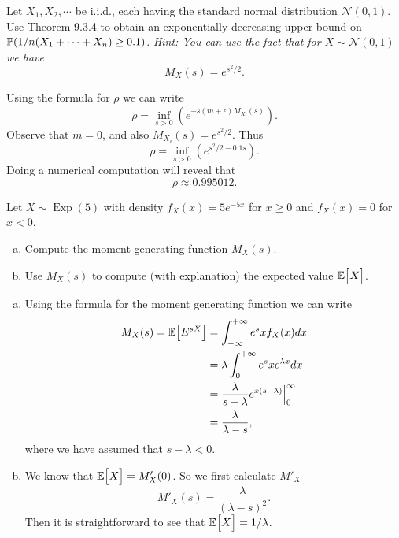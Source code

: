 \begin{problem}
	Let $ X_1,X_2,\cdots $ be i.i.d., each having the standard normal distribution $ \mathcal{N}(0,1) $. Use Theorem 9.3.4 to obtain an exponentially decreasing upper bound on $ \mathbb{P}(1/n(X_1+\cdots+X_n)\geq 0.1) $. \emph{Hint: You can use the fact that for $ X\sim\mathcal{N}(0,1) $ we have}
	\[ M_X(s) = e^{s^2/2}. \]
\end{problem}
\begin{solution}
	Using the formula for $ \rho $ we can write
	\[ \rho = \inf_{s>0}(e^{-s(m+\epsilon)M_{X_i}(s)}). \]
	Observe that $ m = 0 $, and also $ M_{X_i}(s) = e^{s^2/2} $. Thus
	\[ \rho = \inf_{s>0} (e^{s^2/2-0.1s}). \]
	Doing a numerical computation will reveal that
	\[ \rho \approx 0.995012. \]
\end{solution}


\begin{problem}
	Let $ X\sim \operatorname{Exp}(5) $ with density $ f_X(x) = 5e^{-5x} $ for $ x\geq 0 $ and $ f_X(x) = 0 $ for $ x<0 $.
	\begin{enumerate}[(a)]
		\item Compute the moment generating function $ M_X(s) $.
		\item Use $ M_X(s) $ to compute (with explanation) the expected value $ \mathbb{E}\big[X\big] $.
	\end{enumerate}
\end{problem}
\begin{solution}
	\begin{enumerate}[(a)]
		\item Using the formula for the moment generating function we can write
		\begin{align*}
			M_X(s) = \mathbb{E}\big[E^{sX}\big] &= \int_{-\infty}^{+\infty} e^sx f_X(x) dx \\
			&= \lambda \int_{0}^{+\infty} e^sx e^{\lambda x} dx \\
			&= \frac{\lambda}{s-\lambda}e^{x(s-\lambda)}\big|_{0}^\infty \\
			&= \frac{\lambda}{\lambda - s},
		\end{align*}
		where we have assumed that $ s-\lambda < 0 $.
		
		\item We know that $ \mathbb{E}\big[X\big] = M'_X(0) $. So we first calculate $ M'_X $
		\[ M'_X(s) = \frac{\lambda}{(\lambda-s)^2}. \]
		Then it is straightforward to see that $ \mathbb{E}\big[X\big] = 1/\lambda $.
	\end{enumerate}
\end{solution}


